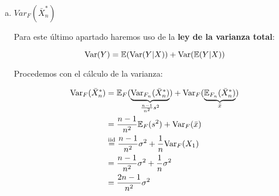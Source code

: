 \documentclass[a4paper]{article}
\begin{document}
\begin{enumerate}[a)]
	\item $Var_{F}(\bar X_n^*)$
	
	Para este último apartado haremos uso de la \textbf{ley de la varianza total}:
	
	\[
		\text{Var}(Y) = \mathbb{E}(\text{Var}(Y|X)) + \text{Var}(\mathbb{E}(Y|X))
	\]
	
	Procedemos con el cálculo de la varianza:
	
	\[
		\begin{split}
			\text{Var}_{F}(\bar X_n^*) & = \mathbb{E}_{F}( \underbrace{\text{Var}_{F_n}(\bar X^*_n)}_{\frac{n-1}{n^2} s^2} ) + \text{Var}_{F}( \underbrace{\mathbb{E}_{F_n}(\bar X^*_n)}_{\bar x} )\\
			& = \frac{n-1}{n^2} \mathbb{E}_{F}(s^2) + \text{Var}_{F}( \bar x ) \\
			& \stackrel{\text{iid}}{=} \frac{n-1}{n^2} \sigma^2 + \frac{1}{n} \text{Var}_{F}(X_1)  \\
			& = \frac{n-1}{n^2} \sigma^2 + \frac{1}{n} \sigma^2 \\
			& = \frac{2n-1}{n^2} \sigma^2 \\
		\end{split}
	\]
	
\end{enumerate}
\end{document}
